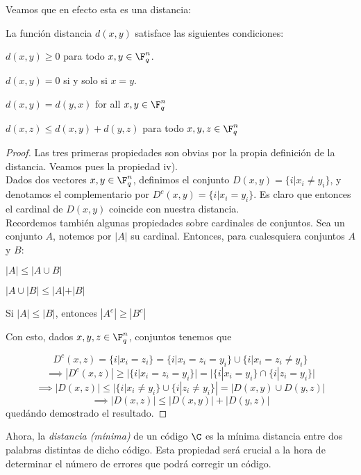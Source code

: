 Veamos que en efecto esta es una distancia:

\begin{proposition}
La función distancia \(d(x,y)\) satisface las siguientes condiciones:
\begin{nlist}
    \item \(d(x,y) \geq 0\) para todo \(x, y \in \F_q^n\).
    \item \(d(x,y) = 0\) si y solo si \(x = y\).
    \item \(d(x,y) = d(y,x)\) for all \(x,y \in \F_q^n\)
    \item \(d(x,z) \leq d(x,y) + d(y,z)\) para todo \(x, y, z \in \F_q^n\)
\end{nlist}

\begin{proof}
Las tres primeras propiedades son obvias por la propia definición de la distancia. Veamos pues la propiedad iv).\\

Dados dos vectores \(x, y \in \F_q^n\), definimos el conjunto \(D(x,y) = \{i | x_i \neq y_i\}\), y denotamos el complementario por \(D^c(x, y) = \{i | x_i = y_i\}\). Es claro que entonces el cardinal de \(D(x,y)\) coincide con nuestra distancia. \\

Recordemos también algunas propiedades sobre cardinales de conjuntos. Sea un conjunto \(A\), notemos por \(|A|\) su cardinal. Entonces, para cualesquiera conjuntos \(A\) y \(B\):
\begin{nlist}
    \item \(|A| \leq |A \cup B|\)
    \item \(|A \cup |B| \leq |A| + |B|\)
    \item Si \(|A| \leq |B|\), entonces \(|A^c| \geq |B^c|\)
\end{nlist}
Con esto, dados \(x, y, z \in \F_q^n\), conjuntos tenemos que

\[
D^c(x,z) = \{i | x_i = z_i\} = \{i | x_i = z_i = y_i\} \cup \{i | x_i = z_i \neq y_i\}
\]
\[
\implies |D^c(x,z)| \geq |\{i | x_i = z_i = y_i\}| = |\{i | x_i = y_i\} \cap \{i | z_i = y_i\}|
\]
\[
\implies |D(x,z)| \leq |\{i | x_i \neq y_i\} \cup \{i | z_i \neq y_i\}| = |D(x,y) \cup D(y,z)|
\]
\[
\implies |D(x,z)| \leq |D(x,y)| + |D(y,z)|
\]
quedándo demostrado el resultado.
\end{proof}
\end{proposition}

Ahora, la \textit{distancia (mínima)} de un código \(\C\) es la mínima distancia entre dos palabras distintas de dicho código. Esta propiedad será crucial a la hora de determinar el número de errores que podrá corregir un código.

